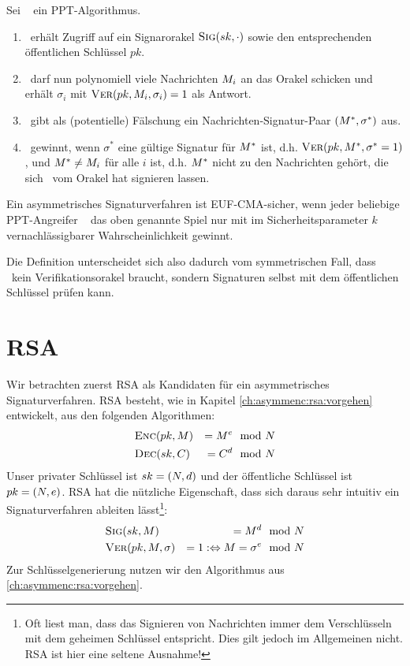 \begin{definition}
Sei \A~ ein PPT-Algorithmus.
\begin{enumerate}
\item \A~erhält Zugriff auf ein Signarorakel $\textsc{Sig}(sk, \cdot)$ sowie den
  entsprechenden öffentlichen Schlüssel $pk$.
\item \A~darf nun polynomiell viele Nachrichten $M_i$ an das
  Orakel schicken und erhält $\sigma_i$ mit $\textsc{Ver}(pk, M_i, \sigma_i)=1$ als Antwort.
\item \A~gibt als (potentielle) Fälschung ein Nachrichten-Signatur-Paar
  $(M^*,\sigma^*)$ aus.
\item \A~gewinnt, wenn $\sigma^*$ eine gültige Signatur für
  $M^*$ ist, d.h. $\textsc{Ver}(pk, M^*, \sigma^* = 1)$, und $M^*
  \neq M_i$ für alle $i$ ist, d.h. $M^*$ nicht zu den
  Nachrichten gehört, die sich \A~vom Orakel hat signieren lassen.
\end{enumerate} 

Ein asymmetrisches Signaturverfahren ist EUF-CMA-sicher, wenn jeder
beliebige PPT-Angreifer \A~ das oben genannte Spiel nur mit im
Sicherheitsparameter $k$ vernachlässigbarer Wahrscheinlichkeit gewinnt. 
\end{definition}

Die Definition unterscheidet sich also dadurch vom symmetrischen Fall,
dass \A~kein Verifikationsorakel braucht, sondern Signaturen selbst mit
dem öffentlichen Schlüssel prüfen kann.

\section{RSA}
Wir betrachten zuerst RSA als Kandidaten für ein asymmetrisches Signaturverfahren. RSA besteht, wie in Kapitel \ref{ch:asymmenc:rsa:vorgehen} entwickelt,
aus den folgenden Algorithmen:
\begin{alignat*}{2}
& \textsc{Enc}(pk, M) &= M^e & \mod N\\
& \textsc{Dec}(sk, C) &= C^d  & \mod N
\end{alignat*}
Unser privater Schlüssel ist $sk = (N, d)$ und der öffentliche
Schlüssel ist $pk = (N, e)$. RSA hat die nützliche Eigenschaft, dass
sich daraus sehr intuitiv ein Signaturverfahren ableiten
lässt\footnote{Oft liest man, dass das Signieren von Nachrichten immer dem
  Verschlüsseln mit dem geheimen Schlüssel entspricht. Dies gilt jedoch
  im Allgemeinen nicht. RSA ist hier eine seltene Ausnahme!}:
\begin{alignat*}{3}
& \textsc{Sig}(sk, M) & = M^d & \mod N\\
& \textsc{Ver}(pk, M, \sigma) & = 1 : \Leftrightarrow M = \sigma^e & \mod N 
\end{alignat*}
Zur Schlüsselgenerierung nutzen wir den Algorithmus aus
\ref{ch:asymmenc:rsa:vorgehen}.

